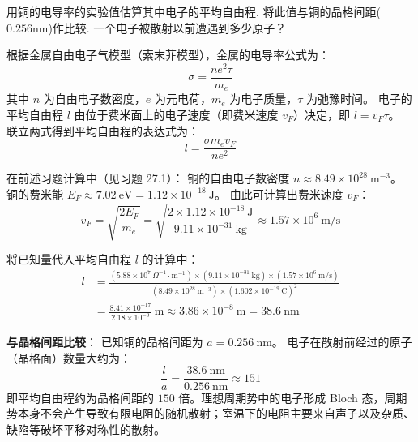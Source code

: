 \begin{exercise}\label{ex:28.6}
用铜的电导率的实验值估算其中电子的平均自由程. 将此值与铜的晶格间距($0.256\mathrm{nm}$)作比较. 一个电子被散射以前遭遇到多少原子？
\end{exercise}
\begin{solution}
根据金属自由电子气模型（索末菲模型），金属的电导率公式为：
$$ \sigma = \frac{n e^2 \tau}{m_e} $$
其中 $n$ 为自由电子数密度，$e$ 为元电荷，$m_e$ 为电子质量，$\tau$ 为弛豫时间。
电子的平均自由程 $l$ 由位于费米面上的电子速度（即费米速度 $v_F$）决定，即 $l = v_F \tau$。
联立两式得到平均自由程的表达式为：
$$ l = \frac{\sigma m_e v_F}{n e^2} $$

在前述习题计算中（见习题 27.1）：
铜的自由电子数密度 $n \approx 8.49 \times 10^{28} \ \mathrm{m^{-3}}$。
铜的费米能 $E_F \approx 7.02 \ \mathrm{eV} = 1.12 \times 10^{-18} \ \mathrm{J}$。
由此可计算出费米速度 $v_F$：
$$ v_F = \sqrt{\frac{2E_F}{m_e}} = \sqrt{\frac{2 \times 1.12 \times 10^{-18} \ \mathrm{J}}{9.11 \times 10^{-31} \ \mathrm{kg}}} \approx 1.57 \times 10^6 \ \mathrm{m/s} $$

将已知量代入平均自由程 $l$ 的计算中：
\begin{align*}
    l &= \frac{(5.88 \times 10^7 \ \Omega^{-1}\cdot\mathrm{m}^{-1}) \times (9.11 \times 10^{-31} \ \mathrm{kg}) \times (1.57 \times 10^6 \ \mathrm{m/s})}{(8.49 \times 10^{28} \ \mathrm{m^{-3}}) \times (1.602 \times 10^{-19} \ \mathrm{C})^2} \\
      &= \frac{8.41 \times 10^{-17}}{2.18 \times 10^{-9}} \ \mathrm{m} \approx 3.86 \times 10^{-8} \ \mathrm{m} = 38.6 \ \mathrm{nm}
\end{align*}

\textbf{与晶格间距比较}：
已知铜的晶格间距为 $a = 0.256 \ \mathrm{nm}$。
电子在散射前经过的原子（晶格面）数量大约为：
$$ \frac{l}{a} = \frac{38.6 \ \mathrm{nm}}{0.256 \ \mathrm{nm}} \approx 151 $$
即平均自由程约为晶格间距的 $150$ 倍。理想周期势中的电子形成 Bloch 态，周期势本身不会产生导致有限电阻的随机散射；室温下的电阻主要来自声子以及杂质、缺陷等破坏平移对称性的散射。
\end{solution}

